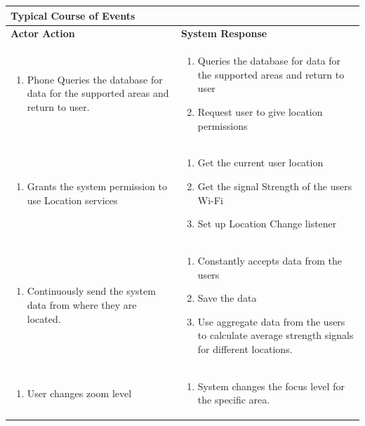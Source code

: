 \begin{longtable}{|p{}|p{}|}\hline
	\multicolumn{2}{|p{1.095\textwidth}|}{\textbf{Typical Course of Events}} \\\hline
	\textbf{Actor Action} & \textbf{System Response} \\\hline
	\begin{enumerate}[series=typical]
		\item Phone Queries the database for data for the supported areas and return to user. 
	\end{enumerate} &
	\begin{enumerate}[resume=typical]
		\item Queries the database for data for the supported areas and return to user
		\item Request user to give location permissions
	\end{enumerate}
	\\\hline
	\begin{enumerate}[resume=typical]
		\item Grants the system permission to use Location services
	\end{enumerate} &
	\begin{enumerate}[resume=typical]
		\item Get the current user location
		\item Get the signal Strength of the users Wi-Fi
		\item Set up Location Change listener
	\end{enumerate}
	\\\hline
	\begin{enumerate}[resume=typical]
		\item Continuously send the system data from where they are located.
	\end{enumerate}
	&
	\begin{enumerate}[resume=typical]
		\item Constantly accepts data from the users 
		\item Save the data
		\item Use aggregate data from the users to calculate average strength signals for different locations.
	\end{enumerate} \\\hline
	\begin{enumerate}[resume=typical]
		\item User changes zoom level
	\end{enumerate}
	& 
	\begin{enumerate}[resume=typical]
		\item System changes the focus level for the specific area.
	\end{enumerate}
	\\\hline
\end{longtable}

